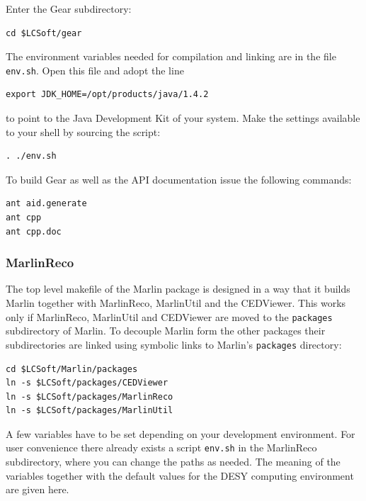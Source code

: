 Enter the Gear subdirectory:

\begin{verbatim}
cd $LCSoft/gear
\end{verbatim}

The environment variables needed for compilation and linking are in the file 
{\tt env.sh}. Open this file and adopt the line 

\begin{verbatim}
export JDK_HOME=/opt/products/java/1.4.2
\end{verbatim}

to point to the Java Development Kit of your system.
Make the settings available to your shell by sourcing the script:

\begin{verbatim}
. ./env.sh 
\end{verbatim}

To build Gear as well as the API documentation
issue the following commands:

\begin{verbatim}
ant aid.generate 
ant cpp 
ant cpp.doc 
\end{verbatim}

\subsubsection*{MarlinReco}

The top level makefile of the Marlin package is designed in a way that it
builds Marlin together with MarlinReco, MarlinUtil and the CEDViewer. 
This works only if MarlinReco, MarlinUtil and CEDViewer are moved to the 
{\tt packages} subdirectory of Marlin. To decouple Marlin form the
other packages their subdirectories are linked using symbolic links to  
Marlin's {\tt packages} directory:

\begin{verbatim} 
cd $LCSoft/Marlin/packages
ln -s $LCSoft/packages/CEDViewer
ln -s $LCSoft/packages/MarlinReco
ln -s $LCSoft/packages/MarlinUtil
\end{verbatim}

A few variables have to be set depending on your development
environment. For user convenience there already exists a script
{\tt env.sh} in the MarlinReco subdirectory, where you can change 
the paths as needed. The meaning of the variables together with the 
default values for the DESY computing environment are given here.

